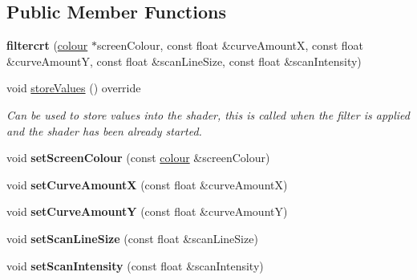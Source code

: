 \subsection*{Public Member Functions}
\begin{DoxyCompactItemize}
\item 
\mbox{\label{classflounder_1_1filtercrt_aeceb7db9c18f0e13242fa1895b142e59}} 
{\bfseries filtercrt} (\hyperlink{classflounder_1_1colour}{colour} $\ast$screen\+Colour, const float \&curve\+AmountX, const float \&curve\+AmountY, const float \&scan\+Line\+Size, const float \&scan\+Intensity)
\item 
void \hyperlink{classflounder_1_1filtercrt_a6b3d151d6e338a7c859aeea1016724dc}{store\+Values} () override
\begin{DoxyCompactList}\small\item\em Can be used to store values into the shader, this is called when the filter is applied and the shader has been already started. \end{DoxyCompactList}\item 
\mbox{\label{classflounder_1_1filtercrt_ac156aff36d490b409b1911f2893bd95f}} 
void {\bfseries set\+Screen\+Colour} (const \hyperlink{classflounder_1_1colour}{colour} \&screen\+Colour)
\item 
\mbox{\label{classflounder_1_1filtercrt_a74e9525a871edaeb291a3470b5c58dd3}} 
void {\bfseries set\+Curve\+AmountX} (const float \&curve\+AmountX)
\item 
\mbox{\label{classflounder_1_1filtercrt_af240aa2427e6b14021fa60780788822f}} 
void {\bfseries set\+Curve\+AmountY} (const float \&curve\+AmountY)
\item 
\mbox{\label{classflounder_1_1filtercrt_af05d18c6418e6adfe6a798f3f86d171a}} 
void {\bfseries set\+Scan\+Line\+Size} (const float \&scan\+Line\+Size)
\item 
\mbox{\label{classflounder_1_1filtercrt_ac4b470e46a16c4625ade473ac00ac758}} 
void {\bfseries set\+Scan\+Intensity} (const float \&scan\+Intensity)
\end{DoxyCompactItemize}
